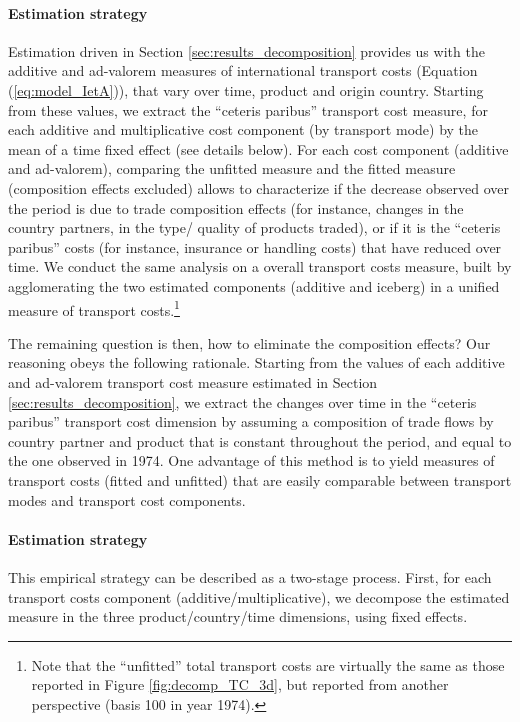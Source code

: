 \documentclass[a4paper,11pt]{article}
\begin{document}
\paragraph{Estimation strategy} Estimation driven in Section \ref{sec:results_decomposition} provides us with the additive and ad-valorem measures of international transport costs (Equation (\ref{eq:model_IetA})), that vary over time, product and origin country. Starting from these values, we extract the ``ceteris paribus'' transport cost measure, for each additive and multiplicative cost component (by transport mode) by the mean of a time fixed effect (see details below). For each cost component (additive and ad-valorem), comparing the unfitted measure and the fitted measure (composition effects excluded) allows to characterize if the decrease observed over the period is due to trade composition effects (for instance, changes in the country partners, in the type/ quality of products traded), or if it is the ``ceteris paribus'' costs (for instance, insurance or handling costs) that have reduced over time. We conduct the same analysis on a overall transport costs measure, built by agglomerating the two estimated components (additive and iceberg) in a unified measure of transport costs.\footnote{Note that the ``unfitted'' total transport costs are virtually the same as those reported in Figure \ref{fig:decomp_TC_3d}, but reported from another perspective (basis 100 in year 1974).}

The remaining question is then, how to eliminate the composition effects? Our reasoning obeys the following rationale. Starting from the values of each additive and ad-valorem transport cost measure estimated in Section \ref{sec:results_decomposition}, we extract the changes over time in the ``ceteris paribus'' transport cost dimension by assuming a composition of trade flows by country partner and product that is constant throughout the period, and equal to the one observed in 1974. One advantage of this method is to yield measures of transport costs (fitted and unfitted) that are easily comparable between transport modes and transport cost components.

\paragraph{Estimation strategy} This empirical strategy can be described as a two-stage process. First, for each transport costs component (additive/multiplicative), we decompose the estimated measure in the three product/country/time dimensions, using fixed effects.
\end{document}
